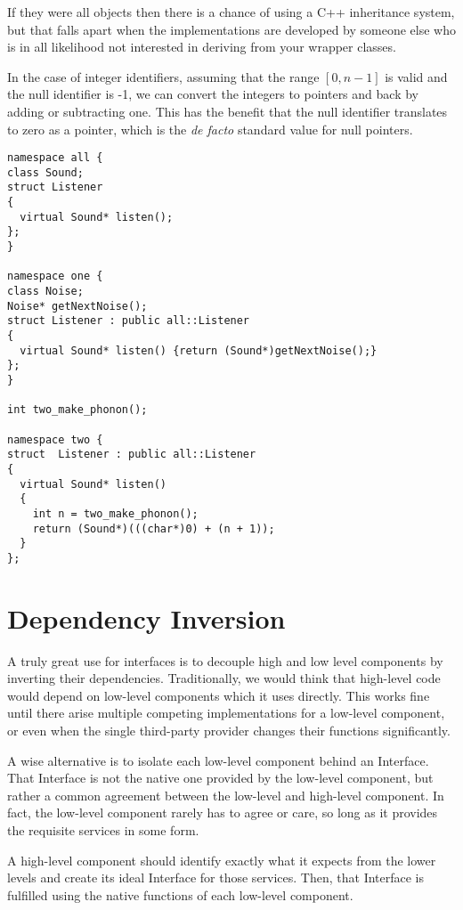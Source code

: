 \documentclass{article}
\begin{document}
If they were all objects then there is a chance of using a C++ inheritance
system, but that falls apart when the implementations are developed by someone
else who is in all likelihood not interested in deriving from your wrapper
classes.

In the case of integer identifiers, assuming that the range $[0,n-1]$ is
valid and the null identifier is -1, we can convert the integers to pointers
and back by adding or subtracting one.
This has the benefit that the null identifier translates to zero as a pointer,
which is the {\it de facto} standard value for null pointers.

\begin{lstlisting}
namespace all {
class Sound;
struct Listener
{
  virtual Sound* listen();
};
}

namespace one {
class Noise;
Noise* getNextNoise();
struct Listener : public all::Listener
{
  virtual Sound* listen() {return (Sound*)getNextNoise();}
};
}

int two_make_phonon();

namespace two {
struct  Listener : public all::Listener
{
  virtual Sound* listen()
  {
    int n = two_make_phonon();
    return (Sound*)(((char*)0) + (n + 1));
  }
};
\end{lstlisting}

\section{Dependency Inversion}

A truly great use for interfaces is to decouple high and low level components
by inverting their dependencies.
Traditionally, we would think that high-level code would depend on low-level
components which it uses directly.
This works fine until there arise multiple competing implementations for
a low-level component, or even when the single third-party provider changes
their functions significantly.

A wise alternative is to isolate each low-level component behind an Interface.
That Interface is not the native one provided by the low-level component,
but rather a common agreement between the low-level and high-level component.
In fact, the low-level component rarely has to agree or care, so long as it
provides the requisite services in some form.

A high-level component should identify exactly what it expects from the lower
levels and create its ideal Interface for those services.
Then, that Interface is fulfilled using the native functions of each low-level
component.
\end{document}
